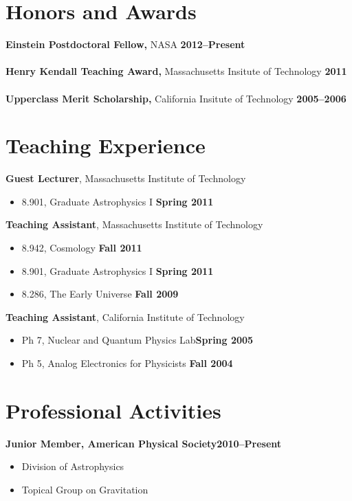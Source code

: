 \documentclass[margin,line]{res}
\begin{document}
\begin{resume}
\section{\sc Honors and Awards}
{\bf Einstein Postdoctoral Fellow,} NASA \hfill {\bf 2012--Present}\\
\\
{\bf Henry Kendall Teaching Award,} Massachusetts Insitute of Technology \hfill {\bf 2011}\\
\\
{\bf Upperclass Merit Scholarship,} California Insitute of Technology \hfill {\bf 2005--2006}\\

\section{\sc Teaching Experience}
{\bf Guest Lecturer}, Massachusetts Institute of Technology
\vspace*{.05in}  
\begin{itemize}
\item[ ] 8.901, Graduate Astrophysics I \hfill {\bf Spring 2011}
\end{itemize}
{\bf Teaching Assistant}, Massachusetts Institute of Technology
\vspace*{.05in}
\begin{itemize}
\item[ ] 8.942, Cosmology \hfill {\bf Fall 2011}
\item[ ] 8.901, Graduate Astrophysics I \hfill {\bf Spring 2011}
\item[ ] 8.286, The Early Universe \hfill {\bf Fall 2009}
\end{itemize}
{\bf Teaching Assistant}, California Institute of Technology
\vspace*{.05in}
\begin{itemize}
\item[ ] Ph 7, Nuclear and Quantum Physics Lab\hfill {\bf Spring 2005}
\item[ ] Ph 5, Analog Electronics for Physicists \hfill {\bf Fall 2004}
\end{itemize}

% 



\section{\sc Professional Activities}
{\bf Junior Member, American Physical Society}\hfill{\bf 2010--Present}
\vspace*{.05in}  
\begin{itemize}
\item[] Division of Astrophysics
\item[] Topical Group on Gravitation
\end{itemize}


\end{resume}
\end{document}
